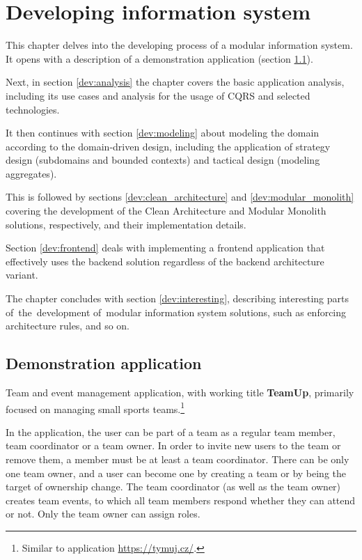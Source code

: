 \chapter{Developing information system}
\label{chapter_dev}
This chapter delves into the developing process of a modular information system. It opens with a description of a demonstration application (section \ref{dev:demo}). 

Next, in section \ref{dev:analysis} the chapter covers the basic application analysis, including its use cases and analysis for the usage of CQRS and selected technologies.

It then continues with section \ref{dev:modeling} about modeling the domain according to the domain-driven design, including the application of strategy design (subdomains and bounded contexts) and tactical design (modeling aggregates).

This is followed by sections \ref{dev:clean_architecture} and \ref{dev:modular_monolith} covering the development of the Clean Architecture and Modular Monolith solutions, respectively, and their implementation details.

Section \ref{dev:frontend} deals with implementing a frontend application that effectively uses the backend solution regardless of the backend architecture  variant.

The chapter concludes with section \ref{dev:interesting}, describing interesting parts of~the~development of~modular information system solutions, such as enforcing architecture rules, and so on.

\section{Demonstration  application}
\label{dev:demo}
Team and event management application, with working title \textbf{TeamUp}, primarily focused on managing small sports teams.\footnote{Similar to application \url{https://tymuj.cz/}.}

In the application, the user can be part of a team as a regular team member, team coordinator or a team owner. In order to invite new users to the team or remove them, a member must be at least a team coordinator. There can be only one team owner, and a user can become one by creating a team or by being the target of ownership change. The team coordinator (as well as the team owner) creates team events, to which all team members respond whether they can attend or not. Only the team owner can assign roles. 

